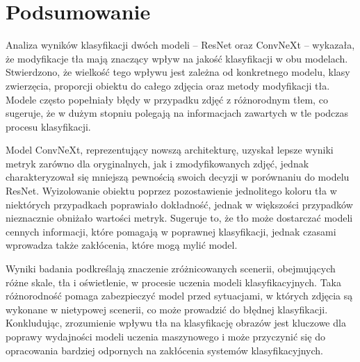 
\chapter*{Podsumowanie}

Analiza wyników klasyfikacji dwóch modeli – ResNet oraz ConvNeXt – wykazała, że modyfikacje tła mają znaczący wpływ na jakość klasyfikacji w obu modelach. Stwierdzono, że wielkość tego wpływu jest zależna od konkretnego modelu, klasy 
zwierzęcia, proporcji obiektu do całego zdjęcia oraz metody modyfikacji tła. Modele często popełniały błędy w przypadku zdjęć z różnorodnym tłem, co sugeruje, że w dużym stopniu polegają na informacjach zawartych w tle podczas procesu 
klasyfikacji.

Model ConvNeXt, reprezentujący nowszą architekturę, uzyskał lepsze wyniki metryk zarówno dla oryginalnych, jak i zmodyfikowanych zdjęć, jednak charakteryzował się mniejszą pewnością swoich decyzji w porównaniu do modelu ResNet. Wyizolowanie 
obiektu poprzez pozostawienie jednolitego koloru tła w niektórych przypadkach poprawiało dokładność, jednak w większości przypadków nieznacznie obniżało wartości metryk. Sugeruje to, że tło może dostarczać modeli cennych informacji, które 
pomagają w poprawnej klasyfikacji, jednak czasami wprowadza także zakłócenia, które mogą mylić model.

Wyniki badania podkreślają znaczenie zróżnicowanych scenerii, obejmujących różne skale, tła i oświetlenie, w procesie uczenia modeli klasyfikacyjnych. Taka różnorodność pomaga zabezpieczyć model przed sytuacjami, w których zdjęcia są wykonane 
w nietypowej scenerii, co może prowadzić do błędnej klasyfikacji. Konkludując, zrozumienie wpływu tła na klasyfikację obrazów jest kluczowe dla poprawy wydajności modeli uczenia maszynowego i może przyczynić się do opracowania bardziej 
odpornych na zakłócenia systemów klasyfikacyjnych.

